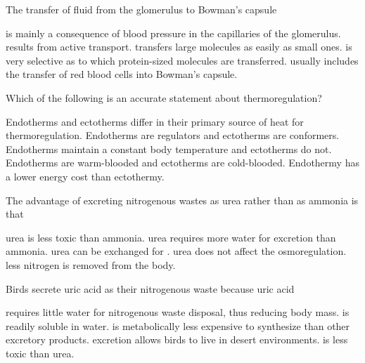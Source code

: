 \question
The transfer of fluid from the glomerulus to Bowman's capsule

\begin{choices}
\correctchoice  is mainly a consequence of blood pressure in the capillaries of the glomerulus. %
\choice results from active transport. %
\choice transfers large molecules  as easily as small ones. %
\choice is very selective as to which protein-sized molecules are transferred. %
\choice usually includes the transfer of red blood cells into Bowman's capsule. %
\end{choices}


\question
Which of the following is an accurate statement about thermoregulation?

\begin{choices}
\correctchoice Endotherms and ectotherms differ in their primary source of heat for thermoregulation. %
\choice Endotherms are regulators and ectotherms are conformers. %
\choice Endotherms maintain a constant body temperature and ectotherms do not. %
\choice Endotherms are warm-blooded and ectotherms are cold-blooded.  %
\choice Endothermy has a lower energy cost than ectothermy. %
\end{choices}



\question
The advantage of excreting nitrogenous wastes as urea rather than as ammonia is that

\begin{choices}
\correctchoice urea is less toxic than ammonia. %
\choice urea requires more water for excretion than ammonia. %
\choice urea can be exchanged for . %
\choice urea does not affect the osmoregulation. %
\choice less nitrogen is removed from the body. %
\end{choices}


\question
Birds secrete uric acid as their nitrogenous waste because uric acid

\begin{choices}
\correctchoice requires little water for nitrogenous waste disposal, thus reducing body mass. %
\choice is readily soluble in water. %
\choice is metabolically less expensive to synthesize than other excretory products. %
\choice excretion allows birds to live in desert environments. %
\choice is less toxic than urea. %
\end{choices}

